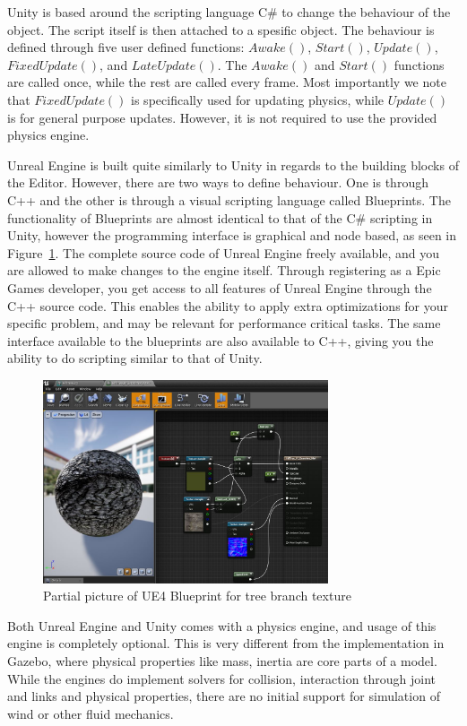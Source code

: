Unity is based around the scripting language C\# to change the behaviour of the object. The script itself is then attached to a spesific object. The behaviour is defined through five user defined functions: $Awake()$, $Start()$, $Update()$, $FixedUpdate()$, and $LateUpdate()$. The $Awake()$ and $Start()$ functions are called once, while the rest are called every frame. Most importantly we note that $FixedUpdate()$ is specifically used for updating physics, while $Update()$ is for general purpose updates. However, it is not required to use the provided physics engine.

Unreal Engine is built quite similarly to Unity in regards to the building blocks of the Editor. However, there are two ways to define behaviour. One is through C++ and the other is through a visual scripting language called Blueprints. The functionality of Blueprints are almost identical to that of the C\# scripting in Unity, however the programming interface is graphical and node based, as seen in Figure~\ref{fig:blueprint_editor}. The complete source code of Unreal Engine freely available, and you are allowed to make changes to the engine itself. Through registering as a Epic Games developer, you get access to all features of Unreal Engine through the C++ source code. This enables the ability to apply extra optimizations for your specific problem, and may be relevant for performance critical tasks. The same interface available to the blueprints are also available to C++, giving you the ability to do scripting similar to that of Unity.

\begin{figure}[!htb]
    \centering
    \includegraphics[height = 6cm]{rapport/fig/Simulator/blueprintprog.JPG}
    \caption{Partial picture of UE4 Blueprint for tree branch texture}
    \label{fig:blueprint_editor}
\end{figure}

Both Unreal Engine and Unity comes with a physics engine, and usage of this engine is completely optional. This is very different from the implementation in Gazebo, where physical properties like mass, inertia are core parts of a model. While the engines do implement solvers for collision, interaction through joint and links and physical properties, there are no initial support for simulation of wind or other fluid mechanics.

